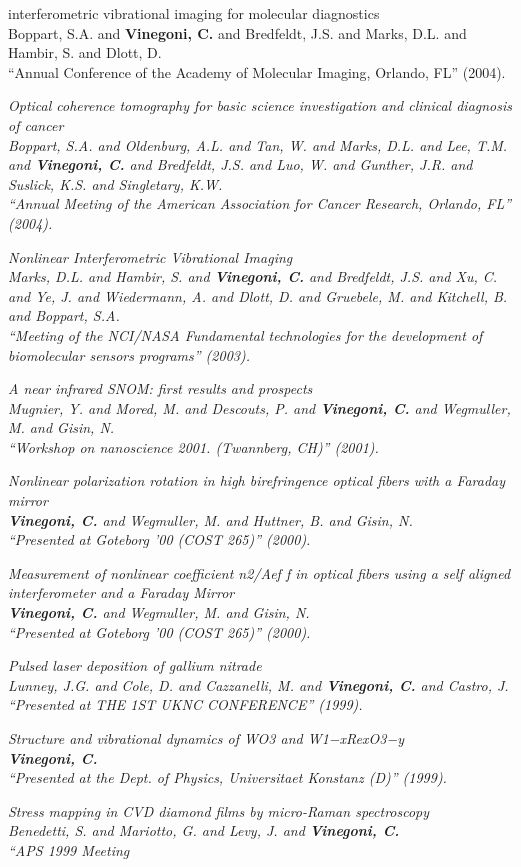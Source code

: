 interferometric vibrational imaging for molecular diagnostics \\ Boppart, S.A. and {\bf Vinegoni, C.} and Bredfeldt, J.S. and Marks, D.L. and Hambir, S. and Dlott, D. \\ ``Annual Conference of the Academy of Molecular Imaging, Orlando, FL''  (2004). \item \it Optical coherence tomography for basic science investigation and clinical diagnosis of cancer \\ Boppart, S.A. and Oldenburg, A.L. and Tan, W. and Marks, D.L. and Lee, T.M. and {\bf Vinegoni, C.} and Bredfeldt, J.S. and Luo, W. and Gunther, J.R. and Suslick, K.S. and Singletary, K.W. \\ ``Annual Meeting of the American Association for Cancer Research, Orlando, FL''  (2004). \item \it Nonlinear Interferometric Vibrational Imaging \\ Marks, D.L. and Hambir, S. and {\bf Vinegoni, C.} and Bredfeldt, J.S. and Xu, C. and Ye, J. and Wiedermann, A. and Dlott, D. and Gruebele, M. and Kitchell, B. and Boppart, S.A. \\ ``Meeting of the NCI/NASA Fundamental technologies for the development of biomolecular sensors programs''  (2003). \item \it A near infrared SNOM: first results and prospects \\ Mugnier, Y. and Mored, M. and Descouts, P. and {\bf Vinegoni, C.} and Wegmuller, M. and Gisin, N. \\ ``Workshop on nanoscience 2001. (Twannberg, CH)''  (2001). \item \it Nonlinear polarization rotation in high birefringence optical fibers with a Faraday mirror \\ {\bf Vinegoni, C.} and Wegmuller, M. and Huttner, B. and Gisin, N. \\ ``Presented at Goteborg ’00 (COST 265)''  (2000). \item \it Measurement of nonlinear coefficient n2/Aef f in optical fibers using a self aligned interferometer and a Faraday Mirror \\ {\bf Vinegoni, C.} and Wegmuller, M. and Gisin, N. \\ ``Presented at Goteborg ’00 (COST 265)''  (2000). \item \it Pulsed laser deposition of gallium nitrade \\ Lunney, J.G. and Cole, D. and Cazzanelli, M. and {\bf Vinegoni, C.} and Castro, J. \\ ``Presented at THE 1ST UKNC CONFERENCE''  (1999). \item \it Structure and vibrational dynamics of WO3 and W1−xRexO3−y \\ {\bf Vinegoni, C.} \\ ``Presented at the Dept. of Physics, Universitaet Konstanz (D)''  (1999). \item \it Stress mapping in CVD diamond films by micro-Raman spectroscopy \\ Benedetti, S. and Mariotto, G. and Levy, J. and {\bf Vinegoni, C.} \\ ``APS 1999 Meeting 